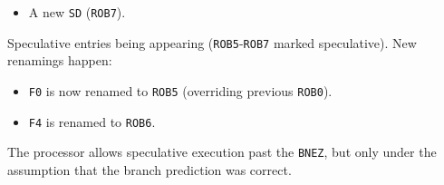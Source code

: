 \begin{examplebox}
\begin{itemize}
\begin{itemize}
\begin{itemize}
                \item A new \texttt{SD} (\texttt{ROB7}).
            \end{itemize}
        \end{itemize}
        Speculative entries being appearing (\texttt{ROB5}-\texttt{ROB7} marked speculative). New renamings happen:
        \begin{itemize}
            \item \texttt{F0} is now renamed to \texttt{ROB5} (overriding previous \texttt{ROB0}).
            \item \texttt{F4} is renamed to \texttt{ROB6}.
        \end{itemize}
        The processor allows speculative execution past the \texttt{BNEZ}, but only under the assumption that the branch prediction was correct.


        \newpage



\end{itemize}
\end{examplebox}
